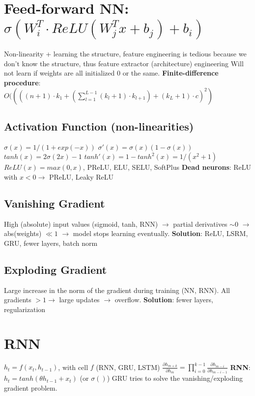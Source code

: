 \documentclass[a4paper, 11pt, landscape]{article}
\begin{document}
\begin{multicols*}{3}
\section{Feed-forward NN: $\sigma(W_i^T\cdot ReLU(W_j^Tx+b_j)+b_i)$}
Non-linearity + learning the structure, feature engineering is tedious because we don't know the structure, thus feature extractor (architecture) engineering\newline
Will not learn if weights are all initialized $0$ or the same.\newline
\textbf{Finite-difference procedure}: \newline
$O((((n+1)\cdot k_1+(\sum_{l=1}^{L-1}(k_l+1)\cdot k_{l+1})+(k_L+1)\cdot c)^2)$

\subsection{Activation Function (non-linearities)}
$\sigma(x)=1/(1+exp(-x))$\quad
$\sigma'(x)=\sigma(x)(1-\sigma(x))$\newline
$tanh(x)=2\sigma(2x)-1$\quad
$tanh'(x)=1-tanh^2(x)=1/(x^2+1)$\newline
$ReLU(x)=max(0,x)$, PReLU, ELU, SELU, SoftPlus\newline
\textbf{Dead neurons}: ReLU with $x<0\rightarrow$ PReLU, Leaky ReLU

\subsection{Vanishing Gradient}
High (absolute) input values (sigmoid, tanh, RNN) $\rightarrow$ partial derivatives $\sim 0$ $\rightarrow$ abs(weights) $\ll 1$ $\rightarrow$ model stops learning eventually.\newline
\textbf{Solution}: ReLU, LSRM, GRU, fewer layers, batch norm

\subsection{Exploding Gradient}
Large increase in the norm of the gradient during training (NN, RNN). All gradients $> 1\rightarrow$ large updates $\rightarrow$ overflow.\newline
\textbf{Solution}: fewer layers, regularization

\section{RNN}
$h_t=f(x_t, h_{t-1})$, with cell $f$ (RNN, GRU, LSTM)\newline
$\frac{\partial h_{m+k}}{\partial h_m}=\prod_{i=0}^{k-1}\frac{\partial h_{m-i}}{\partial h_{m-i-1}}$\newline
\textbf{RNN}: $h_t=tanh(\theta h_{t-1}+x_t)$ (or $\sigma()$)\newline
GRU tries to solve the vanishing/exploding gradient problem.


\end{multicols*}
\end{document}
